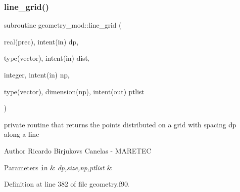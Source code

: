 \subsubsection{\texorpdfstring{line\+\_\+grid()}{line\_grid()}}
{\footnotesize\ttfamily subroutine geometry\+\_\+mod\+::line\+\_\+grid (\begin{DoxyParamCaption}\item[{real(prec), intent(in)}]{dp,  }\item[{type(vector), intent(in)}]{dist,  }\item[{integer, intent(in)}]{np,  }\item[{type(vector), dimension(np), intent(out)}]{ptlist }\end{DoxyParamCaption})\hspace{0.3cm}{\ttfamily [private]}}



private routine that returns the points distributed on a grid with spacing dp along a line 

\begin{DoxyAuthor}{Author}
Ricardo Birjukovs Canelas -\/ M\+A\+R\+E\+T\+EC
\end{DoxyAuthor}

\begin{DoxyParams}[1]{Parameters}
\mbox{\tt in}  & {\em dp,size,np,ptlist} & \\
\hline
\end{DoxyParams}


Definition at line 382 of file geometry.\+f90.


